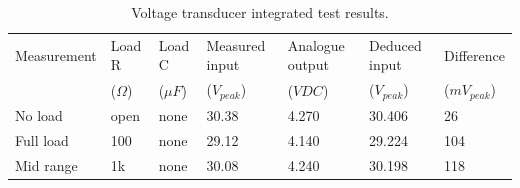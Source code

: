 \begin{table}
        \centering
        \footnotesize
        \caption{Voltage transducer integrated test results.}
         \begin{tabular}{C{1.9cm} C{1.2cm} C{1.2cm} | C{2.5cm} C{2.6cm} C{2.5cm} C{1.8cm}}
           Measurement & Load R & Load C  & Measured input & Analogue output & Deduced input & Difference\\
            & ($\Omega$) & ($\mu F$) & ($V_{peak}$) & ($VDC$) & ($V_{peak}$) & ($mV_{peak}$) \\
        \hline
            No load      & open & none & 30.38 & 4.270 & 30.406  & 26 \\
            Full load    & 100  & none & 29.12 & 4.140 & 29.224  & 104 \\
            Mid range    & 1k   & none & 30.08 & 4.240 & 30.198  & 118\\
          \hline
        \end{tabular}
     \label{tab:voltagetransducerrealtests}
\end{table}

